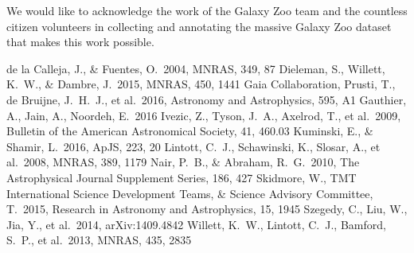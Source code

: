 \documentclass{article}
\begin{document}
We would like to acknowledge the work of the Galaxy Zoo team and the countless citizen volunteers in collecting and annotating the massive Galaxy Zoo dataset that makes this work possible. 


\begin{thebibliography}{9}
 de la Calleja, J., \& Fuentes, O.\ 2004, MNRAS, 349, 87 
 Dieleman, S., Willett, K.~W., \& Dambre, J.\ 2015, MNRAS, 450, 1441
 Gaia Collaboration, Prusti, T., de Bruijne, J.~H.~J., et al.\ 2016, Astronomy and Astrophysics, 595, A1  
 Gauthier, A., Jain, A., Noordeh, E.\ 2016
 Ivezic, Z., Tyson, J.~A., Axelrod, T., et al.\ 2009, Bulletin of the American Astronomical Society, 41, 460.03 
 Kuminski, E., \& Shamir, L.\ 2016, ApJS, 223, 20 
 Lintott, C.~J., Schawinski, K., Slosar, A., et al.\ 2008, MNRAS, 389, 1179
 Nair, P.~B., \& Abraham, R.~G.\ 2010, The Astrophysical Journal Supplement Series, 186, 427 
 Skidmore, W., TMT International Science Development Teams, \& Science Advisory Committee, T.\ 2015, Research in Astronomy and Astrophysics, 15, 1945 
 Szegedy, C., Liu, W., Jia, Y., et al.\ 2014, arXiv:1409.4842 
 Willett, K.~W., Lintott, C.~J., Bamford, S.~P., et al.\ 2013, MNRAS, 435, 2835  
\end{thebibliography}
\end{document}
